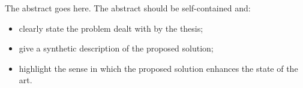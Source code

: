 

\begin{abstracts}

The abstract goes here. The abstract should be self-contained and:
\begin{itemize}
    \item clearly state the problem dealt with by the thesis; \item give a synthetic description of the proposed solution;
    \item  highlight the sense in which the proposed solution enhances the state of the art.
\end{itemize}

\end{abstracts}
